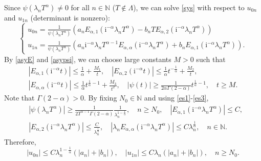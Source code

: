 \documentclass[reqno]{amsart}
\makeatletter
\renewenvironment{proof}[1][\proofname]{\par
  \pushQED{\qed}%
  \normalfont \topsep6\p@\@plus6\p@\relax
  \trivlist
  \item[\hskip\labelsep\bfseries #1\@addpunct{.}]%
}{%
  \popQED\endtrivlist\@endpefalse
}
\numberwithin{equation}{section}
\makeatother
\begin{document}
\begin{proof}
Since $\psi\left(\lambda_n T^\alpha\right) \neq 0$ for all $n \in \mathbb{N}$ ($T\notin \Lambda$), we can solve \eqref{sys} with respect to $u_{0n}$ and $u_{1n}$ (determinant is nonzero):
$$
\left\{\begin{array}{l}
u_{0n}=\frac{1}{\psi\left(\lambda_n T^\alpha\right)}\left(a_n E_{\alpha, 1}\left(\mathrm{i}^{-\alpha}\lambda_n T^\alpha\right)-b_n T E_{\alpha, 2}\left(\mathrm{i}^{-\alpha}\lambda_n T^\alpha\right)\right) \\
u_{1n}=\frac{1}{\psi\left(\lambda_n T^\alpha\right)}\left(a_n \mathrm{i}^{-\alpha}\lambda_n T^{\alpha-1} E_{\alpha, \alpha}\left(\mathrm{i}^{-\alpha}\lambda_n T^\alpha\right)+b_n E_{\alpha, 1}\left(\mathrm{i}^{-\alpha}\lambda_n T^\alpha\right)\right).
\end{array}\right.
$$
By \eqref{asyE} and \eqref{asypsi}, we can choose large constants $M>0$ such that
$$
\begin{gathered}
\left|E_{\alpha, 1}(\mathrm{i}^{-\alpha}t)\right| \leq \frac{1}{\alpha}+\frac{M_1}{t}, \quad\left|E_{\alpha, 2}(\mathrm{i}^{-\alpha}t)\right| \leq \frac{1}{\alpha} t^{-\frac{1}{\alpha}} + \frac{M_2}{t}, \\
\left|E_{\alpha, \alpha}(\mathrm{i}^{-\alpha}t)\right| \leq \frac{1}{\alpha} t^{\frac{1}{\alpha}-1} + \frac{M_3}{t^2}, \quad|\psi(t)| \geq \frac{1}{2\alpha \Gamma(2-\alpha)} t^{\frac{1}{\alpha}-1}, \quad t \geq M.
\end{gathered}
$$
Note that $\Gamma(2-\alpha)>0$. By fixing $N_0 \in \mathbb{N}$ and using \eqref{es1}-\eqref{es3},
\begin{align}
&\left|\psi\left(\lambda_n T^\alpha\right)\right| \geq \frac{1}{2 T^{\alpha-1} \Gamma(2-\alpha)} \frac{1}{\lambda_n^{1-\frac{1}{\alpha}}}, \quad n \geq N_0, \quad \left|E_{\alpha, 1}\left(\mathrm{i}^{-\alpha}\lambda_n T^\alpha\right)\right| \le C,\nonumber\\%
&\left|E_{\alpha, 2}\left(\mathrm{i}^{-\alpha}\lambda_n T^\alpha\right)\right| \le \frac{C}{\lambda_n^{\frac{1}{\alpha}}}, \quad\left|\lambda_n E_{\alpha, \alpha}\left(\mathrm{i}^{-\alpha}\lambda_n T^\alpha\right)\right| \leq C \lambda_n^{\frac{1}{\alpha}}, \quad n\in \mathbb{N}. \label{estEa}
\end{align}
Therefore,
\begin{equation}\label{esu0u1}
\left|u_{0n}\right| \leq C \lambda_n^{1-\frac{1}{\alpha}}\left( \left|a_n\right|+\left|b_n\right|\right), \quad\left|u_{1n}\right| \leq C \lambda_n\left(\left|a_n\right|+\left|b_n\right|\right), \quad n \geq N_0.

\end{equation}
\end{proof}
\end{document}
